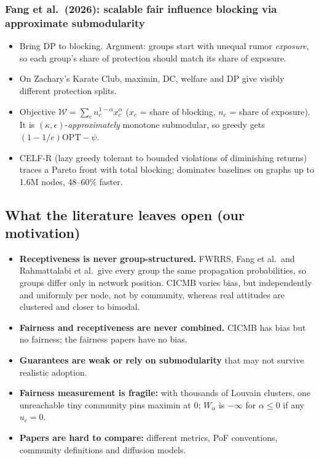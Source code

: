 \documentclass[11pt]{article}
\newenvironment{notebox}[2]{\def\boxcolor{#1}\par\medskip\noindent{\color{\boxcolor}\rule{\linewidth}{1.2pt}}\par\nopagebreak
  \noindent{\color{\boxcolor}\bfseries #2}\par\nopagebreak\smallskip}{\par\nopagebreak\noindent{\color{\boxcolor}\rule{\linewidth}{1.2pt}}\par\medskip}
\newenvironment{keybox}[1][Key points]{\begin{notebox}{blue!55!black}{#1}}{\end{notebox}}
\begin{document}
\subsubsection*{Fang et al.\ (2026): scalable fair influence blocking via approximate submodularity}
\begin{itemize}
\item Bring DP to blocking. Argument: groups start with unequal rumor \emph{exposure}, so each group's share of protection should match its share of exposure.
\item On Zachary's Karate Club, maximin, DC, welfare and DP give visibly different protection splits.
\item Objective $\mathcal W=\sum_c n_c^{1-\alpha}x_c^\alpha$ ($x_c$ = share of blocking, $n_c$ = share of exposure). It is $(\kappa,\epsilon)$-\emph{approximately} monotone submodular, so greedy gets $(1-1/e)\mathrm{OPT}-\psi$.
\item CELF-R (lazy greedy tolerant to bounded violations of diminishing returns) traces a Pareto front with total blocking; dominates baselines on graphs up to 1.6M nodes, 48--60\% faster.
\end{itemize}

\subsection{What the literature leaves open (our motivation)}
\begin{keybox}[The gap we targeted]
\begin{itemize}
\item \textbf{Receptiveness is never group-structured.} FWRRS, Fang et al.\ and Rahmattalabi et al.\ give every group the same propagation probabilities, so groups differ only in network position. CICMB varies bias, but independently and uniformly per node, not by community, whereas real attitudes are clustered and closer to bimodal.
\item \textbf{Fairness and receptiveness are never combined.} CICMB has bias but no fairness; the fairness papers have no bias.
\item \textbf{Guarantees are weak or rely on submodularity} that may not survive realistic adoption.
\item \textbf{Fairness measurement is fragile:} with thousands of Louvain clusters, one unreachable tiny community pins maximin at $0$; $W_\alpha$ is $-\infty$ for $\alpha\le0$ if any $u_c=0$.
\item \textbf{Papers are hard to compare:} different metrics, PoF conventions, community definitions and diffusion models.
\end{itemize}
\end{keybox}
\end{document}
